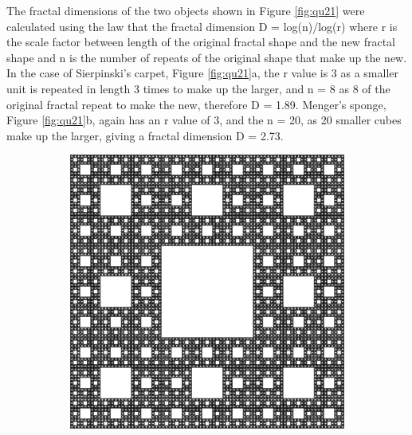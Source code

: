 \documentclass{article}
\begin{document}
\noindent \newline The fractal dimensions of the two objects shown in Figure \ref{fig:qu21} were calculated using the law that the fractal dimension D = log(n)/log(r) where r is the scale factor between length of the original fractal shape and the new fractal shape and n is the number of repeats of the original shape that make up the new. In the case of Sierpinski's carpet, Figure \ref{fig:qu21}a, the r value is 3 as a smaller unit is repeated in length 3 times to make up the larger, and n = 8 as 8 of the original fractal repeat to make the new, therefore D = 1.89. Menger's sponge, Figure \ref{fig:qu21}b, again has an r value of 3, and the n = 20, as 20 smaller cubes make up the larger, giving a fractal dimension D = 2.73.

	\begin{figure}[H]
		\centering
		\begin{subfigure}[t]{0.37\linewidth}
			\includegraphics[width=\linewidth]{../Data/Sierpinski_carpet.jpg}
			\caption{}
		\end{subfigure}
		\begin{subfigure}[t]{0.5\linewidth}

\end{subfigure}
\end{figure}
\end{document}
